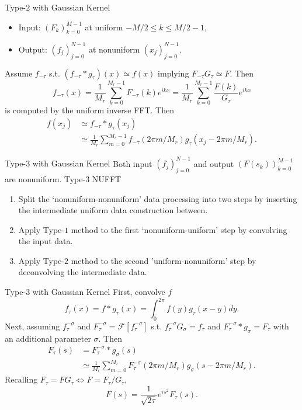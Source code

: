 \documentclass{beamer}
\begin{document}
\begin{frame}{Type-$2$ with Gaussian Kernel}
  \begin{itemize}
    \item Input: $(F_{k})_{k=0}^{M-1}$ at uniform $-M/2 \le k \le M/2-1$,
    \item Output: $(f_{j})_{j=0}^{N-1}$ at nonuniform $(x_{j})_{j=0}^{N-1}$.
  \end{itemize}
  Assume $f_{-\tau}$ s.t. $(f_{-\tau}\ast g_{\tau})(x) \simeq f(x)$ implying 
  $F_{-\tau}G_{\tau} \simeq F$. Then 
  \begin{equation}
      f_{-\tau}(x) 
    = \frac{1}{M_{r}}\sum_{k=0}^{M_{r}-1} F_{-\tau}(k)e^{ikx}
    = \frac{1}{M_{r}}\sum_{k=0}^{M_{r}-1} \frac{F(k)}{G_{\tau}}e^{ikx}
  \end{equation}
  is computed by the uniform inverse FFT. Then 
  \begin{align}
       f(x_{j}) 
    &\simeq f_{-\tau}\ast g_{\tau}(x_{j}) \\
    &\simeq \frac{1}{M_{r}}\sum_{m=0}^{M_{r}-1}f_{-\tau}(2\pi m/M_{r})g_{\tau}(x_{j} - 2\pi m/M_{r}).
  \end{align}
\end{frame}

\begin{frame}{Type-$3$ with Gaussian Kernel}
  Both input $(f_{j})_{j=0}^{N-1}$ and output $(F(s_{k}))_{k=0}^{M-1}$ are nonuniform.
  Type-$3$ NUFFT 
  \begin{enumerate}
    \item Split the `nonuniform-nonuniform' data processing into two steps
    by inserting the intermediate uniform data construction between.
    \item Apply Type-$1$ method to the first `nonuniform-uniform' step by convolving the input data.
    \item Apply Type-$2$ method to the second 'uniform-nonuniform' step by deconvolving the intermediate data.
  \end{enumerate}
\end{frame}

\begin{frame}{Type-$3$ with Gaussian Kernel}
  First, convolve $f$ 
  \begin{equation}
      f_{\tau}(x) = f\ast g_{\tau} (x) = \int_{0}^{2\pi} f(y)g_{\tau}(x-y) dy.
  \end{equation}
  Next, assuming $f_{\tau}^{-\sigma}$ and $F_{\tau}^{-\sigma} = \mathcal{F}[f_{\tau}^{-\sigma}]$
  s.t. 
  $f_{\tau}^{-\sigma}G_{\sigma} = f_{\tau}$ and $F_{\tau}^{-\sigma}\ast g_{\sigma} = F_{\tau}$
  with an additional parameter $\sigma$. Then 
  \begin{align}
    F_{\tau}(s) &= F_{\tau}^{-\sigma}\ast g_{\sigma} (s) \\
    &\simeq \frac{1}{M_{r}}\sum_{m=0}^{M_{r}}
            F_{\tau}^{-\sigma}(2\pi m/M_{r})g_{\sigma}(s - 2\pi m/M_{r}).
  \end{align}
  Recalling $F_{\tau} = FG_{\tau} \Leftrightarrow F = F_{\tau}/G_{\tau}$,
  \begin{equation}
    F(s) = \frac{1}{\sqrt{2\tau}}e^{\tau s^2}F_{\tau}(s).
  \end{equation}
\end{frame}
\end{document}
